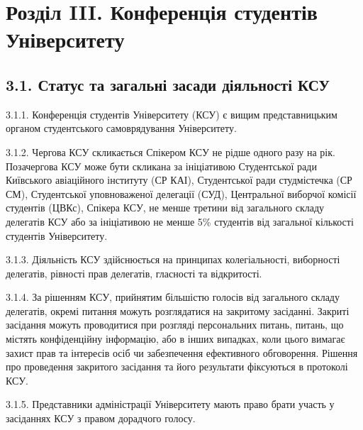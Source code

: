 \section*{Розділ III. Конференція студентів Університету}

\subsection*{3.1. Статус та загальні засади діяльності КСУ}
    3.1.1. Конференція студентів Університету (КСУ) є вищим представницьким органом студентського самоврядування Університету.

    3.1.2. Чергова КСУ скликається Спікером КСУ не рідше одного разу на рік. Позачергова КСУ може бути скликана за ініціативою Студентської ради Київського авіаційного інституту (СР КАІ), Студентської ради студмістечка (СР СМ), Студентської уповноваженої делегації (СУД), Центральної виборчої комісії студентів (ЦВКс), Спікера КСУ, не менше третини від загального складу делегатів КСУ або за ініціативою не менше 5\% студентів від загальної кількості студентів Університету.

    3.1.3. Діяльність КСУ здійснюється на принципах колегіальності, виборності делегатів, рівності прав делегатів, гласності та відкритості.

    3.1.4. За рішенням КСУ, прийнятим більшістю голосів від загального складу делегатів, окремі питання можуть розглядатися на закритому засіданні. Закриті засідання можуть проводитися при розгляді персональних питань, питань, що містять конфіденційну інформацію, або в інших випадках, коли цього вимагає захист прав та інтересів осіб чи забезпечення ефективного обговорення. Рішення про проведення закритого засідання та його результати фіксуються в протоколі КСУ.

    3.1.5. Представники адміністрації Університету мають право брати участь у засіданнях КСУ з правом дорадчого голосу.


